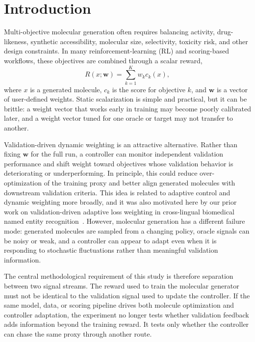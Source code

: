 \documentclass[referee,lineno,pdflatex,sn-basic]{sn-jnl}
\theoremstyle{thmstyleone}%
\theoremstyle{thmstyletwo}%
\theoremstyle{thmstylethree}%
\begin{document}

\maketitle

\section{Introduction}\label{sec:introduction}

Multi-objective molecular generation often requires balancing activity, drug-likeness, synthetic accessibility, molecular size, selectivity, toxicity risk, and other design constraints. In many reinforcement-learning (RL) and scoring-based workflows, these objectives are combined through a scalar reward,
\begin{equation}
R(x; \mathbf{w}) = \sum_{k=1}^{K} w_k c_k(x),
\label{eq:scalar_reward}
\end{equation}
where $x$ is a generated molecule, $c_k$ is the score for objective $k$, and $\mathbf{w}$ is a vector of user-defined weights. Static scalarization is simple and practical, but it can be brittle: a weight vector that works early in training may become poorly calibrated later, and a weight vector tuned for one oracle or target may not transfer to another.

Validation-driven dynamic weighting is an attractive alternative. Rather than fixing $\mathbf{w}$ for the full run, a controller can monitor independent validation performance and shift weight toward objectives whose validation behavior is deteriorating or underperforming. In principle, this could reduce over-optimization of the training proxy and better align generated molecules with downstream validation criteria. This idea is related to adaptive control and dynamic weighting more broadly, and it was also motivated here by our prior work on validation-driven adaptive loss weighting in cross-lingual biomedical named entity recognition~\cite{zhang2026validationner}. However, molecular generation has a different failure mode: generated molecules are sampled from a changing policy, oracle signals can be noisy or weak, and a controller can appear to adapt even when it is responding to stochastic fluctuations rather than meaningful validation information.

The central methodological requirement of this study is therefore separation between two signal streams. The reward used to train the molecular generator must not be identical to the validation signal used to update the controller. If the same model, data, or scoring pipeline drives both molecule optimization and controller adaptation, the experiment no longer tests whether validation feedback adds information beyond the training reward. It tests only whether the controller can chase the same proxy through another route.
\end{document}
